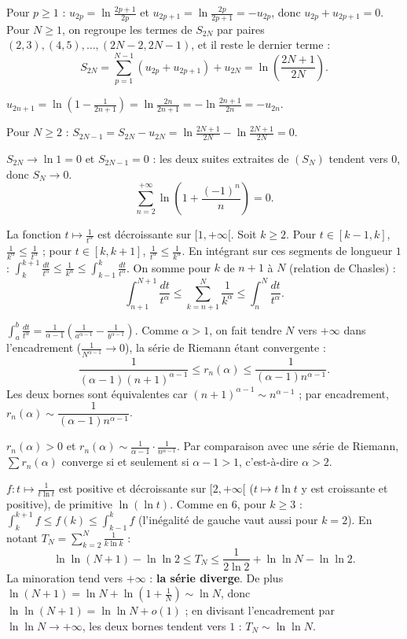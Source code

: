 \documentclass[a4paper,11pt]{article}
\numberwithin{equation}{section}
\numberwithin{figure}{section}
\numberwithin{table}{section}
\theoremstyle{enonce}
\theoremstyle{exemple}
\theoremstyle{remarque}
\newcommand{\Q}[1]{\par\needspace{3\baselineskip}\medskip\noindent{\sffamily\bfseries\color{Bleu}#1}\enspace}
\begin{document}
\Q{5.(a)} Pour $p\geq1$ : $u_{2p}=\ln\frac{2p+1}{2p}$ et $u_{2p+1}=\ln\frac{2p}{2p+1}=-u_{2p}$, donc $u_{2p}+u_{2p+1}=0$. Pour $N\geq1$, on regroupe les termes
de $S_{2N}$ par paires $(2,3),(4,5),\dots,(2N-2,2N-1)$, et il reste le dernier terme :
\[S_{2N}=\sum_{p=1}^{N-1}(u_{2p}+u_{2p+1})+u_{2N}=\ln\left(\frac{2N+1}{2N}\right).\]

\Q{5.(b)} $u_{2n+1}=\ln\left(1-\frac1{2n+1}\right)=\ln\frac{2n}{2n+1}=-\ln\frac{2n+1}{2n}=-u_{2n}$.

\Q{5.(c)} Pour $N\geq2$ : $S_{2N-1}=S_{2N}-u_{2N}=\ln\frac{2N+1}{2N}-\ln\frac{2N+1}{2N}=0$.

\Q{5.(d)} $S_{2N}\to\ln1=0$ et $S_{2N-1}=0$ : les deux suites extraites de $(S_N)$ tendent vers $0$, donc $S_N\to0$.
\[\sum_{n=2}^{+\infty}\ln\left(1+\frac{(-1)^n}n\right)=0.\]

\Q{6.} La fonction $t\mapsto\frac1{t^\alpha}$ est décroissante sur $[1,+\infty[$. Soit $k\geq2$. Pour $t\in[k-1,k]$, $\frac1{k^\alpha}\leq\frac1{t^\alpha}$ ; pour $t\in[k,k+1]$,
$\frac1{t^\alpha}\leq\frac1{k^\alpha}$. En intégrant sur ces segments de longueur $1$ : $\int_k^{k+1}\frac{dt}{t^\alpha}\leq\frac1{k^\alpha}\leq\int_{k-1}^k\frac{dt}{t^\alpha}$. On somme pour $k$ de
$n+1$ à $N$ (relation de Chasles) :
\[\int_{n+1}^{N+1}\frac{dt}{t^\alpha}\leq\sum_{k=n+1}^N\frac1{k^\alpha}\leq\int_n^N\frac{dt}{t^\alpha}.\]

\Q{7.} $\int_a^b\frac{dt}{t^\alpha}=\frac1{\alpha-1}\left(\frac1{a^{\alpha-1}}-\frac1{b^{\alpha-1}}\right)$. Comme $\alpha>1$, on fait tendre $N$ vers $+\infty$ dans l'encadrement
($\frac1{N^{\alpha-1}}\to0$), la série de Riemann étant convergente :
\[\frac1{(\alpha-1)(n+1)^{\alpha-1}}\leq r_n(\alpha)\leq\frac1{(\alpha-1)n^{\alpha-1}}.\]
Les deux bornes sont équivalentes car $(n+1)^{\alpha-1}\sim n^{\alpha-1}$ ; par encadrement, $r_n(\alpha)\sim\dfrac1{(\alpha-1)n^{\alpha-1}}$.

\Q{8.} $r_n(\alpha)>0$ et $r_n(\alpha)\sim\frac1{\alpha-1}\cdot\frac1{n^{\alpha-1}}$. Par comparaison avec une série de Riemann, $\sum r_n(\alpha)$ converge si et seulement si
$\alpha-1>1$, c'est-à-dire \textbf{$\alpha>2$}.

\Q{9.} $f:t\mapsto\frac1{t\ln t}$ est positive et décroissante sur $[2,+\infty[$ ($t\mapsto t\ln t$ y est croissante et positive), de primitive $\ln(\ln t)$.
Comme en 6, pour $k\geq3$ : $\int_k^{k+1}f\leq f(k)\leq\int_{k-1}^kf$ (l'inégalité de gauche vaut aussi pour $k=2$). En notant $T_N=\sum_{k=2}^N\frac1{k\ln k}$ :
\[\ln\ln(N+1)-\ln\ln2\leq T_N\leq\frac1{2\ln2}+\ln\ln N-\ln\ln2.\]
La minoration tend vers $+\infty$ : \textbf{la série diverge}. De plus $\ln(N+1)=\ln N+\ln\left(1+\frac1N\right)\sim\ln N$, donc $\ln\ln(N+1)=\ln\ln N+o(1)$ ;
en divisant l'encadrement par $\ln\ln N\to+\infty$, les deux bornes tendent vers $1$ : \textbf{$T_N\sim\ln\ln N$}.
\end{document}
